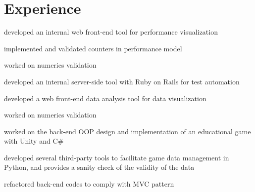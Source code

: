 \documentclass[]{deedy-resume-openfont}
\begin{document}
\hfill
\begin{minipage}[t]{0.66\textwidth} 


\section{Experience}

\vspace{\topsep} %
\begin{tightemize} 
\item developed an internal web front-end tool for performance visualization
\item implemented and validated counters in performance model
\item worked on numerics validation
\end{tightemize}
\sectionsep

\begin{tightemize} 
\item developed an internal server-side tool with Ruby on Rails for test automation
\item developed a web front-end data analysis tool for data visualization
\item worked on numerics validation
\end{tightemize}
\sectionsep

\begin{tightemize} 
\item worked on the back-end OOP design and implementation of an educational game with Unity and C\#
\item developed several third-party tools to facilitate game data management in Python, and provides a sanity check of the validity of the data
\item refactored back-end codes to comply with MVC pattern
\end{tightemize}
\sectionsep


\end{minipage}
\end{document}
